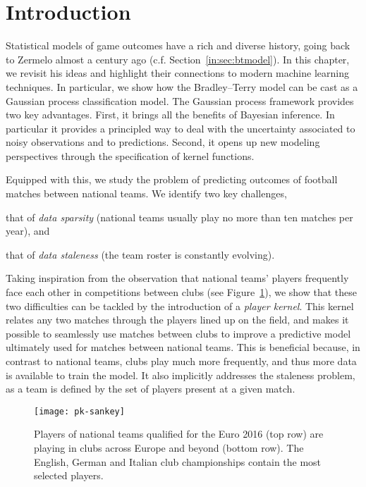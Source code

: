 \section{Introduction}
\label{pk:sec:intro}


Statistical models of game outcomes have a rich and diverse history, going back to Zermelo almost a century ago (c.f. Section~\ref{in:sec:btmodel}).
In this chapter, we revisit his ideas and highlight their connections to modern machine learning techniques.
In particular, we show how the Bradley--Terry model can be cast as a Gaussian process classification model.
The Gaussian process framework provides two key advantages.
First, it brings all the benefits of Bayesian inference.
In particular it provides a principled way to deal with the uncertainty associated to noisy observations and to predictions.
Second, it opens up new modeling perspectives through the specification of kernel functions.

Equipped with this, we study the problem of predicting outcomes of football matches between national teams.
We identify two key challenges,
\begin{enuminline}
\item that of \emph{data sparsity} (national teams usually play no more than ten matches per year), and
\item that of \emph{data staleness} (the team roster is constantly evolving).
\end{enuminline}
Taking inspiration from the observation that national teams' players frequently face each other in competitions between clubs (see Figure~\ref{pk:fig:sankey}), we show that these two difficulties can be tackled by the introduction of a \emph{player kernel}.
This kernel relates any two matches through the players lined up on the field, and makes it possible to seamlessly use matches between clubs to improve a predictive model ultimately used for matches between national teams.
This is beneficial because, in contrast to national teams, clubs play much more frequently, and thus more data is available to train the model.
It also implicitly addresses the staleness problem, as a team is defined by the set of players present at a given match.

\begin{figure}
  \centering
  \texttt{[image: pk-sankey]}
  \caption{
  Players of national teams qualified for the Euro 2016 (top row) are playing in clubs across Europe and beyond (bottom row).
  The English, German and Italian club championships contain the most selected players.
}
  \label{pk:fig:sankey}
\end{figure}

